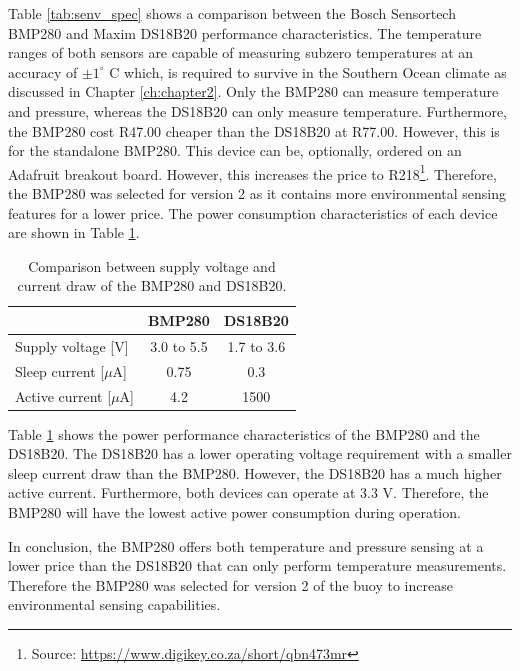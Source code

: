 Table \ref{tab:senv_spec} shows a comparison between the Bosch Sensortech BMP280 and Maxim DS18B20 performance characteristics. The temperature ranges of both sensors are capable of measuring subzero temperatures at an accuracy of $\pm1^\circ$ C which, is required to survive in the Southern Ocean climate as discussed in Chapter \ref{ch:chapter2}. Only the BMP280 can measure temperature and pressure, whereas the DS18B20 can only measure temperature. Furthermore, the BMP280 cost R47.00 cheaper than the DS18B20 at R77.00. However, this is for the standalone BMP280. This device can be, optionally,  ordered on an Adafruit breakout board. However, this increases the price to R218\footnote{Source: \url{https://www.digikey.co.za/short/qbn473mr}}. Therefore, the BMP280 was selected for version 2 as it contains more environmental sensing features for a lower price. The power consumption characteristics of each device are shown in Table \ref{tab:env_power}.

\begin{table}[H]
	\centering
	\caption{Comparison between supply voltage and current draw of the BMP280 and DS18B20.}
	\setlength{\extrarowheight}{5pt}
	\begin{tabular}{lcc}
		\hline
		&  \textbf{BMP280} & \textbf{DS18B20}\\
		\hline
		\hline
		Supply voltage [V] & 3.0 to 5.5 & 1.7 to 3.6\\
		\hline
		Sleep current [$\mu$A]& 0.75 & 0.3\\ 
		\hline
		Active current [$\mu$A] & 4.2 &1500 \\
		\hline
		\hline

	\end{tabular}
	\label{tab:env_power}
\end{table}

Table \ref{tab:env_power} shows the power performance characteristics of the BMP280 and the DS18B20. The DS18B20 has a lower operating voltage requirement with a smaller sleep current draw than the BMP280. However, the DS18B20 has a much higher active current. Furthermore, both devices can operate at 3.3 V. Therefore, the BMP280 will have the lowest active power consumption during operation. \par 

In conclusion, the BMP280 offers both temperature and pressure sensing at a lower price than the DS18B20 that can only perform temperature measurements. Therefore the BMP280 was selected for version 2 of the buoy to increase environmental sensing capabilities.

